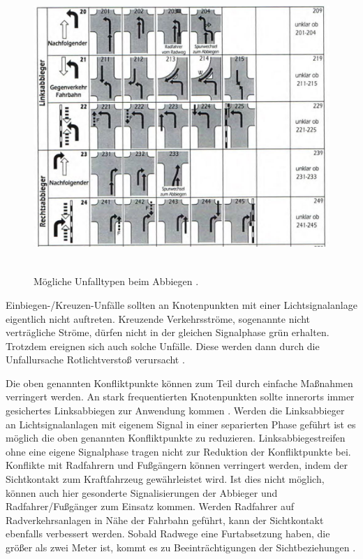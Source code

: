 \begin{savenotes}
	\begin{figure}[H]
		\centering
		\includegraphics[width=13cm,height=11cm]{figures/Abbiege-Unfall}
		\caption[Unfalltyp 2 Abbiege-Unfall]{Mögliche Unfalltypen beim Abbiegen \parencite[S. 11]{GesamtverbandderDeutschenVersicherungswirtschafte.V..2016}. }\label{fig:Abbiege-Unfall}
	\end{figure}
\end{savenotes}

Einbiegen-/Kreuzen-Unfälle sollten an Knotenpunkten mit einer Lichtsignalanlage eigentlich nicht auftreten. Kreuzende Verkehrsströme, sogenannte nicht verträgliche Ströme, dürfen nicht in der gleichen Signalphase grün erhalten. Trotzdem ereignen sich auch solche Unfälle. Diese werden dann durch die Unfallursache Rotlichtverstoß verursacht \parencite[S. 274]{Schreiber.2016}. 

Die oben genannten Konfliktpunkte können zum Teil durch einfache Maßnahmen verringert werden. An stark frequentierten Knotenpunkten sollte innerorts immer gesichertes Linksabbiegen zur Anwendung kommen \parencite[S. 275]{Schreiber.2016}. Werden die Linksabbieger an Lichtsignalanlagen mit eigenem Signal in einer separierten Phase geführt ist es möglich die oben genannten Konfliktpunkte zu reduzieren. Linksabbiegestreifen ohne eine eigene Signalphase tragen nicht zur Reduktion der Konfliktpunkte bei. 
Konflikte mit Radfahrern und Fußgängern können verringert werden, indem der Sichtkontakt zum Kraftfahrzeug gewährleistet wird. Ist dies nicht möglich, können auch hier gesonderte Signalisierungen der Abbieger und Radfahrer/Fußgänger zum Einsatz kommen. Werden Radfahrer auf Radverkehrsanlagen in Nähe der Fahrbahn geführt, kann der Sichtkontakt ebenfalls verbessert werden. Sobald Radwege eine Furtabsetzung haben, die größer als zwei Meter ist, kommt es zu Beeinträchtigungen der Sichtbeziehungen \parencite[S. 276f]{Schreiber.2016}.

